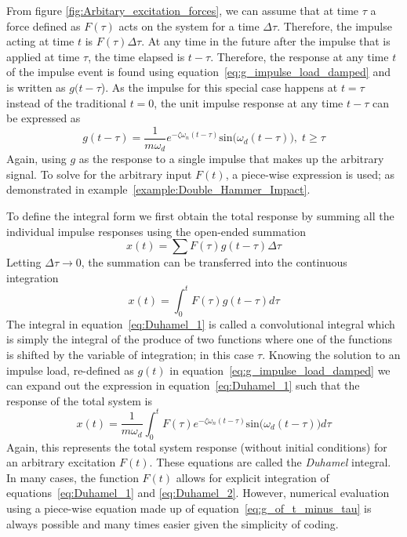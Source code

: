 \documentclass[12pt,letter]{article}
\begin{document}
From figure \ref{fig:Arbitary_excitation_forces}, we can assume that at time $\tau$ a force defined as $F(\tau)$ acts on the system for a time $\Delta \tau$. Therefore, the impulse acting at time $t$ is $F(\tau) \Delta \tau$.
At any time in the future after the impulse that is applied at time $\tau$, the time elapsed is $t - \tau$. Therefore, the response at any time $t$ of the impulse event is found using equation~\ref{eq:g_impulse_load_damped} and is written as $g(t-\tau$). As the impulse for this special case happens at $t=\tau$ instead of the traditional $t=0$, the unit impulse response at any time $t-\tau$ can be expressed as
\begin{equation}
g(t-\tau) = \frac{1}{m \omega_d} e^{-\zeta \omega_n (t-\tau)} \text{sin}\big(\omega_d (t-\tau)\big), \;  t \ge \tau
\label{eq:g_of_t_minus_tau}
\end{equation}
Again, using $g$ as the response to a single impulse that makes up the arbitrary signal. To solve for the arbitrary input $F(t)$, a piece-wise expression is used; as demonstrated in example~\ref{example:Double_Hammer_Impact}.



To define the integral form we first obtain the total response by summing all the individual impulse responses using the open-ended summation
\begin{equation}
	x(t) = \sum F( \tau ) g(t- \tau ) \Delta \tau
\end{equation}
Letting $\Delta \tau \rightarrow 0$, the summation can be transferred into the continuous integration  
\begin{equation}
	x(t) = \int_{0}^{t} F( \tau ) g(t- \tau ) d \tau
	\label{eq:Duhamel_1}	
\end{equation}
The integral in equation~\ref{eq:Duhamel_1} is called a convolutional integral which is simply the integral of the produce of two functions where one of the functions is shifted by the variable of integration; in this case $\tau$. Knowing the solution to an impulse load, re-defined as $g(t)$ in equation~\ref{eq:g_impulse_load_damped} we can expand out the expression in equation~\ref{eq:Duhamel_1} such that the response of the total system is
\begin{equation}
	x(t) = \frac{1}{m \omega_d} \int_{0}^{t} F(\tau) e^{-\zeta \omega_n (t-\tau)} \text{sin}\big(\omega_d(t-\tau)\big) d \tau
	\label{eq:Duhamel_2}	
\end{equation}
Again, this represents the total system response (without initial conditions) for an arbitrary excitation $F(t)$.  These equations are called the \textit{Duhamel} integral. In many cases, the function $F(t)$ allows for explicit integration of equations~\ref{eq:Duhamel_1} and \ref{eq:Duhamel_2}. However, numerical evaluation using a piece-wise equation made up of equation~\ref{eq:g_of_t_minus_tau} is always possible and many times easier given the simplicity of coding. 
\end{document}
